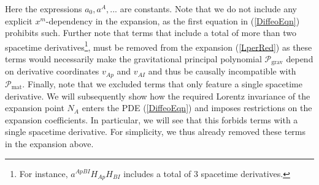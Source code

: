 \documentclass[%
 reprint,
nofootinbib,
 amsmath,amssymb,
 aps,
 prd,
floatfix,
]{revtex4-2}
\begin{document}
Here the expressions $a_0, a^{A},...$ are constants.
Note that we do not include any explicit $x^m$-dependency in the expansion, as the first equation in (\ref{DiffeoEqn}) prohibits such. 
Further note that terms that include a total of more than two spacetime derivatives\footnote{For instance, $a^{ApBI}H_{Ap}H_{BI}$ includes a total of $3$ spacetime derivatives.},  must be removed from the expansion (\ref{LperRed}) as these terms would necessarily make the gravitational principal polynomial $\mathcal{P}_{\text{grav}}$ depend on derivative coordinates $v_{Ap}$ and $v_{AI}$ and thus be causally incompatible with $\mathcal{P}_{\text{mat}}$.
Finally, note that we excluded terms that only feature a single spacetime derivative. We will subsequently show how the required Lorentz invariance of the expansion point $N_A$ enters the PDE (\ref{DiffeoEqn}) and imposes restrictions on the expansion coefficients. In particular, we will see that this forbids terms with a single spacetime derivative. For simplicity, we thus already removed these terms in the expansion above.
\end{document}
